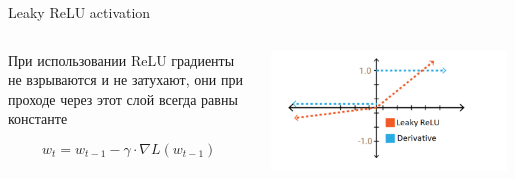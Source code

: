 \documentclass[notes,12pt, aspectratio=169]{beamer}
\newenvironment{wideitemize}{\itemize\addtolength{\itemsep}{10pt}}{\enditemize}
\begin{document}
\begin{frame}{Leaky ReLU activation}
\begin{columns}
	\begin{column}{0.4\textwidth}
		\begin{wideitemize}
			\item  При использовании ReLU градиенты не взрываются и не затухают, они при проходе через этот слой всегда равны константе
			
			$$
			w_t = w_{t-1} - \gamma \cdot \nabla L(w_{t-1})
			$$
			
		\end{wideitemize}
	\end{column}
	\hfill
	\begin{column}{0.6\textwidth}
		
		\begin{center}
			\includegraphics[width=0.98\textwidth]{leaky_relu_der.png} 
		\end{center} 
	\end{column}
\end{columns}
\end{frame}
\end{document}
